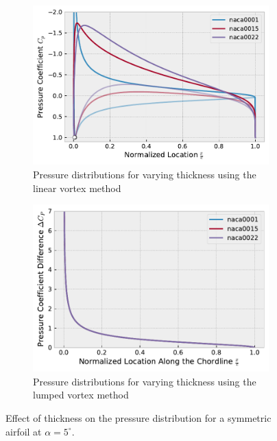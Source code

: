\begin{figure}[h]
  \centering
  \begin{subfigure}{.5\textwidth}
    \centering
    \captionsetup{width=.8\linewidth}
    \includegraphics[width=.9\linewidth]{static/thick_tc_a5.pdf}
    \caption{\centering Pressure distributions for varying thickness using the linear vortex method}
    \label{fig:thick_tc}
  \end{subfigure}\hfill%
  \begin{subfigure}{.5\textwidth}
    \centering
    \captionsetup{width=.8\linewidth}
    \includegraphics[width=.9\linewidth]{static/thin_tc_a5.pdf}
    \caption{\centering  Pressure distributions for varying thickness using the lumped vortex method}
    \label{fig:thin_tc}
  \end{subfigure}
  \caption{\centering Effect of thickness on the pressure distribution for a symmetric airfoil at $\alpha = 5^{\circ}$.}
  \label{fig:thickcp}
\end{figure}

